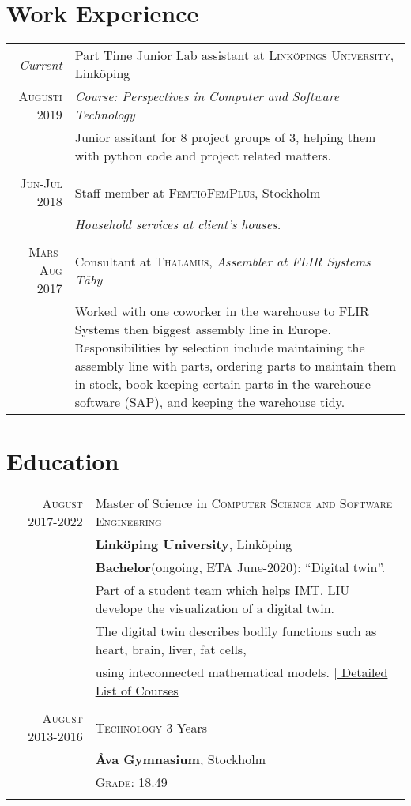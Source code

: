 \documentclass[a4paper,10pt]{article}
\begin{document}
\section{Work Experience}
\begin{tabular}{r|p{11cm}}
 \emph{Current} & Part Time Junior Lab assistant at \textsc{Linköpings University}, Linköping \\\textsc{Augusti 2019}&
          \emph{Course: Perspectives in Computer and Software Technology}\\&\footnotesize{Junior assitant for 8 project groups of 3, helping them with python code and project related matters.}\\\multicolumn{2}{c}{} \\
 \textsc{Jun-Jul 2018} & Staff member at \textsc{FemtioFemPlus}, Stockholm \\&\emph{Household services at client's houses.}\\\multicolumn{2}{c}{} \\
\textsc{Mars-Aug 2017} & Consultant at \textsc{Thalamus}, \emph{Assembler at FLIR Systems Täby}\\&\footnotesize{Worked with one coworker in the warehouse to FLIR Systems then biggest assembly line in Europe. 
                                                                Responsibilities by selection include maintaining the assembly line with parts, ordering parts to maintain them in stock, book-keeping certain parts in the warehouse software (SAP), and keeping the warehouse tidy.}
\end{tabular}
\section{Education}
\begin{tabular}{rl}	
 \textsc{August} 2017-2022 & Master of Science in \textsc{Computer Science and Software Engineering} \\& \textbf{Linköping University}, Linköping\\
& \textbf{Bachelor}(ongoing, ETA June-2020): ``Digital twin''. \\
&\footnotesize Part of a student team which helps IMT, LIU develope the visualization of a digital twin. \\&\footnotesize The digital twin describes bodily functions such as heart, brain, liver, fat cells,\\&\footnotesize  using inteconnected mathematical models. \hyperlink{grds_liu}{\hfill| \footnotesize Detailed List of Courses} \\\\
\textsc{August} 2013-2016& \textsc{Technology} 3 Years \\& \normalsize\textbf{Åva Gymnasium}, Stockholm\\
&\normalsize \textsc{Grade}: 18.49\\&\\

\end{tabular}
\end{document}
